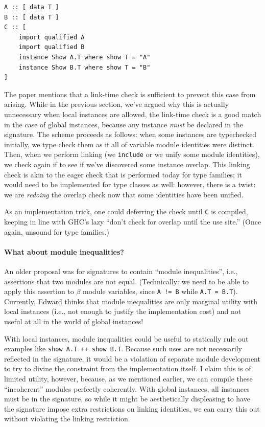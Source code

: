\documentclass{article}
\begin{document}
\begin{verbatim}
A :: [ data T ]
B :: [ data T ]
C :: [
    import qualified A
    import qualified B
    instance Show A.T where show T = "A"
    instance Show B.T where show T = "B"
]
\end{verbatim}

The paper mentions that a link-time check is sufficient to prevent this
case from arising.  While in the previous section, we've argued why this
is actually unnecessary when local instances are allowed, the link-time
check is a good match in the case of global instances, because any
instance \emph{must} be declared in the signature.  The scheme proceeds
as follows: when some instances are typechecked initially, we type check
them as if all of variable module identities were distinct.  Then, when
we perform linking (we \verb|include| or we unify some module
identities), we check again if to see if we've discovered some instance
overlap.  This linking check is akin to the eager check that is
performed today for type families; it would need to be implemented for
type classes as well: however, there is a twist: we are \emph{redoing}
the overlap check now that some identities have been unified.

As an implementation trick, one could deferring the check until \verb|C|
is compiled, keeping in line with GHC's lazy ``don't check for overlap
until the use site.''  (Once again, unsound for type families.)

\paragraph{What about module inequalities?}  An older proposal was for
signatures to contain ``module inequalities'', i.e., assertions that two
modules are not equal.  (Technically: we need to be able to apply this
assertion to $\beta$ module variables, since \verb|A != B| while
\verb|A.T = B.T|).  Currently, Edward thinks that module inequalities
are only marginal utility with local instances (i.e., not enough to
justify the implementation cost) and not useful at all in the world of
global instances!

With local instances, module inequalities could be useful to statically
rule out examples like \verb|show A.T ++ show B.T|.  Because such uses
are not necessarily reflected in the signature, it would be a violation
of separate module development to try to divine the constraint from the
implementation itself.  I claim this is of limited utility, however, because,
as we mentioned earlier, we can compile these ``incoherent'' modules perfectly
coherently.  With global instances, all instances must be in the signature, so
while it might be aesthetically displeasing to have the signature impose
extra restrictions on linking identities, we can carry this out without
violating the linking restriction.
\end{document}
